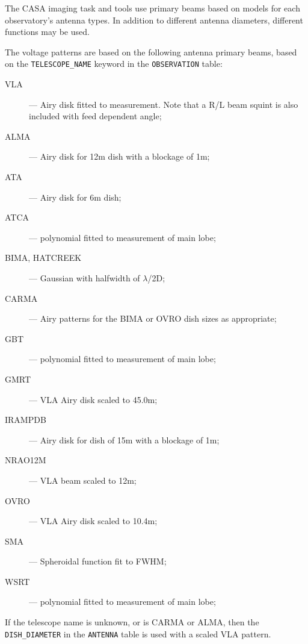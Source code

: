 The CASA imaging task and tools use primary beams based on models
for each observatory's antenna types.  In addition to different 
antenna diameters, different functions may be used.  

The voltage patterns are based on the following antenna primary beams,
based on the {\tt TELESCOPE\_NAME} keyword in the {\tt OBSERVATION}
table:
\begin{description}
\item[VLA] --- Airy disk fitted to measurement. Note that a R/L beam
squint is also included with feed dependent angle;

\item[ALMA] --- Airy disk for 12m dish with a blockage of 1m;

\item[ATA] --- Airy disk for 6m dish;

\item[ATCA] --- polynomial fitted to measurement of main lobe;

\item[BIMA, HATCREEK] --- Gaussian with halfwidth of $\lambda$/2D;

\item[CARMA] --- Airy patterns for the BIMA or OVRO dish sizes as appropriate;

\item[GBT] --- polynomial fitted to measurement of main lobe;

\item[GMRT] --- VLA Airy disk scaled to 45.0m;

\item[IRAMPDB] --- Airy disk for dish of 15m with a blockage of 1m;

\item[NRAO12M] ---  VLA beam scaled to 12m;

\item[OVRO] --- VLA Airy disk scaled to 10.4m;

\item[SMA] --- Spheroidal function fit to FWHM;

\item[WSRT] --- polynomial fitted to measurement of main lobe;

\end{description}

If the telescope name is unknown, or is CARMA or ALMA, then the
{\tt DISH\_DIAMETER} in the {\tt ANTENNA} table is used with a
scaled VLA pattern.


